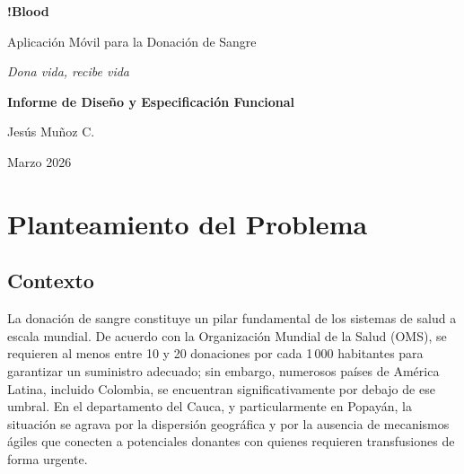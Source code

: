 \documentclass[12pt, a4paper]{article}
\begin{document}
\begin{titlepage}
\centering
\vspace*{3cm}

{\Huge\bfseries\textcolor{bloodred}{!Blood}\par}
\vspace{0.5cm}
{\Large Aplicación Móvil para la Donación de Sangre\par}
\vspace{1cm}
{\large\textit{Dona vida, recibe vida}\par}

\vspace{2cm}

{\Large\bfseries Informe de Diseño y Especificación Funcional\par}

\vspace{3cm}

{\large
Jesús Muñoz C.\\[0.3cm]
}

\vspace{2cm}

{\large Marzo 2026\par}

\vfill
\end{titlepage}

\newpage
\tableofcontents
\newpage

\section{Planteamiento del Problema}

\subsection{Contexto}

La donación de sangre constituye un pilar fundamental de los sistemas de salud a escala mundial. De acuerdo con la Organización Mundial de la Salud (OMS), se requieren al menos entre 10 y 20 donaciones por cada 1\,000 habitantes para garantizar un suministro adecuado; sin embargo, numerosos países de América Latina, incluido Colombia, se encuentran significativamente por debajo de ese umbral. En el departamento del Cauca, y particularmente en Popayán, la situación se agrava por la dispersión geográfica y por la ausencia de mecanismos ágiles que conecten a potenciales donantes con quienes requieren transfusiones de forma urgente.
\end{document}
